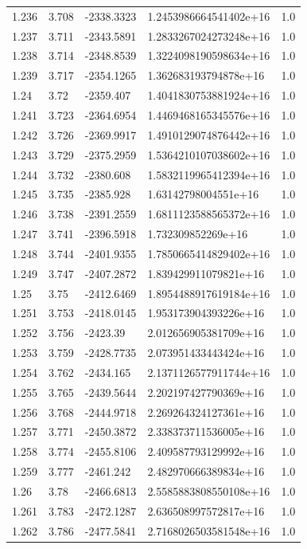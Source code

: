\begin{tabular}{lllll}
1.236 & 3.708 & -2338.3323 & 1.2453986664541402e+16 & 1.0 \\
1.237 & 3.711 & -2343.5891 & 1.2833267024273248e+16 & 1.0 \\
1.238 & 3.714 & -2348.8539 & 1.3224098190598634e+16 & 1.0 \\
1.239 & 3.717 & -2354.1265 & 1.362683193794878e+16 & 1.0 \\
1.24 & 3.72 & -2359.407 & 1.4041830753881924e+16 & 1.0 \\
1.241 & 3.723 & -2364.6954 & 1.4469468165345576e+16 & 1.0 \\
1.242 & 3.726 & -2369.9917 & 1.4910129074876442e+16 & 1.0 \\
1.243 & 3.729 & -2375.2959 & 1.5364210107038602e+16 & 1.0 \\
1.244 & 3.732 & -2380.608 & 1.5832119965412394e+16 & 1.0 \\
1.245 & 3.735 & -2385.928 & 1.63142798004551e+16 & 1.0 \\
1.246 & 3.738 & -2391.2559 & 1.6811123588565372e+16 & 1.0 \\
1.247 & 3.741 & -2396.5918 & 1.732309852269e+16 & 1.0 \\
1.248 & 3.744 & -2401.9355 & 1.7850665414829402e+16 & 1.0 \\
1.249 & 3.747 & -2407.2872 & 1.839429911079821e+16 & 1.0 \\
1.25 & 3.75 & -2412.6469 & 1.8954488917619184e+16 & 1.0 \\
1.251 & 3.753 & -2418.0145 & 1.953173904393226e+16 & 1.0 \\
1.252 & 3.756 & -2423.39 & 2.012656905381709e+16 & 1.0 \\
1.253 & 3.759 & -2428.7735 & 2.073951433443424e+16 & 1.0 \\
1.254 & 3.762 & -2434.165 & 2.1371126577911744e+16 & 1.0 \\
1.255 & 3.765 & -2439.5644 & 2.202197427790369e+16 & 1.0 \\
1.256 & 3.768 & -2444.9718 & 2.269264324127361e+16 & 1.0 \\
1.257 & 3.771 & -2450.3872 & 2.338373711536005e+16 & 1.0 \\
1.258 & 3.774 & -2455.8106 & 2.409587793129992e+16 & 1.0 \\
1.259 & 3.777 & -2461.242 & 2.482970666389834e+16 & 1.0 \\
1.26 & 3.78 & -2466.6813 & 2.5585883808550108e+16 & 1.0 \\
1.261 & 3.783 & -2472.1287 & 2.636508997572817e+16 & 1.0 \\
1.262 & 3.786 & -2477.5841 & 2.7168026503581548e+16 & 1.0 \\

\end{tabular}
